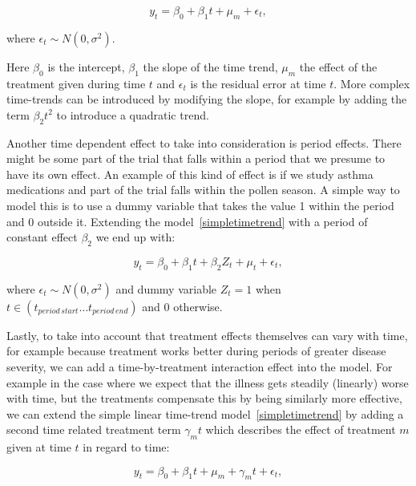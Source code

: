 \documentclass[12pt,a4paper,leqno]{report}
\theoremstyle{plain}
\theoremstyle{definition}
\theoremstyle{remark}
\begin{document}
\begin{def}\label{}
    \begin{equation}\label{simpletimetrend}
        y_t = \beta_0 + \beta_1 t + \mu_m + \epsilon_t,
    \end{equation}
\end{def}where \(\epsilon_t \sim N(0,\sigma^2)\).

Here \(\beta_0\) is the intercept, \(\beta_1\) the slope of the time trend,
\(\mu_m\) the effect of the treatment given during time \(t\) and \(\epsilon_t\)
is the residual error at time \(t\). More complex time-trends can be introduced
by modifying the slope, for example by adding the term \(\beta_2 t^2\) to
introduce a quadratic trend.

Another time dependent effect to take into consideration is period effects.
There might be some part of the trial that falls within a period that we presume
to have its own effect. An example of this kind of effect is if we study asthma
medications and part of the trial falls within the pollen season. A simple way
to model this is to use a dummy variable that takes the value 1 within the
period and 0 outside it. Extending the model\ \ref{simpletimetrend} with a period of constant
effect \(\beta_2\) we end up with:

\begin{def}\label{}
    \begin{equation}\label{}
        y_t = \beta_0 + \beta_1 t + \beta_{2}Z_t + \mu_t + \epsilon_t,
    \end{equation}
\end{def}where \(\epsilon_t \sim N(0,\sigma^2)\) and dummy variable \(Z_t = 1\)
when \(t \in (t_{period\,start} \ldots t_{period\,end}) \) and \(0\) otherwise.

Lastly, to take into account that treatment effects themselves can vary with
time, for example because treatment works better during periods of greater
disease severity, we can add a time-by-treatment interaction effect into the
model. For example in the case where we expect that the illness gets steadily
(linearly) worse with time, but the treatments compensate this by being
similarly more effective, we can extend the simple linear
time-trend model\ \ref{simpletimetrend} by adding a second time related
treatment term \(\gamma_m t\) which describes the effect of treatment \(m \) given at
time \(t \) in regard to time:

\begin{def}\label{}
    \begin{equation}\label{}
        y_t = \beta_0 + \beta_1 t + \mu_m + \gamma_m t + \epsilon_t,
    \end{equation}
\end{def}
\end{document}
